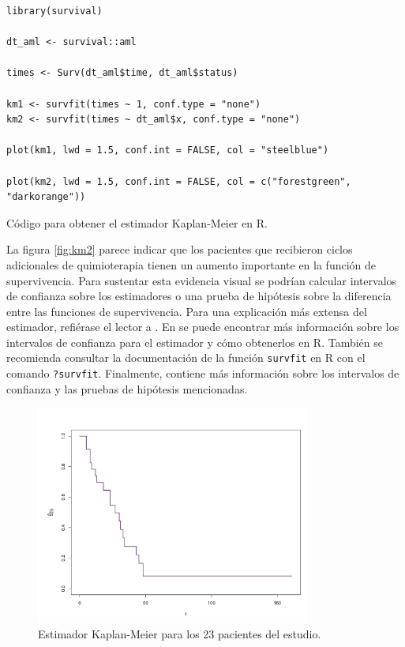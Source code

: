 \documentclass[11pt,a4paper]{article}
\begin{document}
\begin{table}[htb]
\begin{lstlisting}
library(survival)

dt_aml <- survival::aml

times <- Surv(dt_aml$time, dt_aml$status)

km1 <- survfit(times ~ 1, conf.type = "none")
km2 <- survfit(times ~ dt_aml$x, conf.type = "none")

plot(km1, lwd = 1.5, conf.int = FALSE, col = "steelblue")

plot(km2, lwd = 1.5, conf.int = FALSE, col = c("forestgreen", "darkorange"))
\end{lstlisting}
\caption{Código para obtener el estimador Kaplan-Meier en R.}
\label{cod:km}
\end{table}

La figura \ref{fig:km2} parece indicar que los pacientes que recibieron ciclos adicionales de quimioterapia tienen un aumento importante en la función de supervivencia. Para sustentar esta evidencia visual se podrían calcular intervalos de confianza sobre los estimadores o una prueba de hipótesis sobre la diferencia entre las funciones de supervivencia. Para una explicación más extensa del estimador, refiérase el lector a \citet{kaplan-meier}. En \citet{moore} se puede encontrar más información sobre los intervalos de confianza para el estimador y cómo obtenerlos en R. También se recomienda consultar la documentación de la función \texttt{survfit} en R con el comando \texttt{?survfit}. Finalmente, \citet{klein} contiene más información sobre los intervalos de confianza y las pruebas de hipótesis mencionadas.

 \begin{figure}[htb]
\centering\includegraphics[width=9cm]{km1.png}
\caption{Estimador Kaplan-Meier para los 23 pacientes del estudio.}
\label{fig:km1}
\end{figure}
\end{document}
